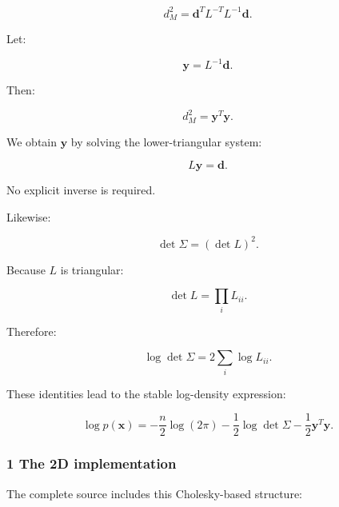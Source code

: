 \[
 d_M^2= \mathbf d^TL^{-T}L^{-1}\mathbf d.
\]

Let:

\[
 \mathbf y=L^{-1}\mathbf d.
\]

Then:

\[
 \boxed{d_M^2=\mathbf y^T\mathbf y}.
\]

We obtain \(\mathbf y\) by solving the lower-triangular system:

\[
 L\mathbf y=\mathbf d.
\]

No explicit inverse is required.

Likewise:

\[
 \det\Sigma=(\det L)^2.
\]

Because \(L\) is triangular:

\[
 \det L=\prod_iL_{ii}.
\]

Therefore:

\[
 \boxed{ \log\det\Sigma = 2\sum_i\log L_{ii} }.
\]

These identities lead to the stable log-density expression:

\[
 \boxed{ \log p(\mathbf x)= -\frac n2\log(2\pi) -\frac12\log\det\Sigma -\frac12\mathbf y^T\mathbf y }.
\]

\subsubsection{1 The 2D implementation}\label{02-foundations-ii-ch031-the-2d-implementation}

\hypertarget{02-foundations-ii-ch031-the-2d-implementation}{}

The complete source includes this Cholesky-based structure:

